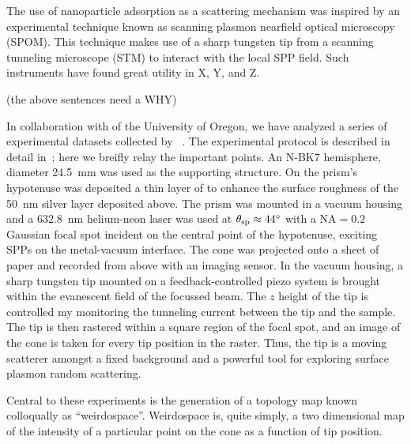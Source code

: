 The use of nanoparticle adsorption as a scattering mechanism was inspired
by an experimental technique known as scanning plasmon nearfield optical
microscopy (SPOM).  This technique makes use of a sharp tungsten tip from a
scanning tunneling microscope (STM) to interact with the local SPP field.
Such instruments have found great utility in X, Y, and Z.

(the above sentences need a WHY)

In collaboration with  of the University of Oregon, we have
analyzed a series of experimental datasets collected by
~\cite{schumann2009surface}.  The experimental protocol is
described in detail in~\cite{schumann2009surface}; here we breifly relay
the important points.  An N-BK7 hemisphere, diameter
\SI{24.5}{\milli\meter} was used as the supporting structure.  On the
prism's hypotenuse was deposited a thin layer of  to enhance the
surface roughness of the \SI{50}{\nano\meter} silver layer deposited above.
The prism was mounted in a vacuum housing and a \SI{632.8}{\nano\meter}
helium-neon laser was used at $\theta_\mathrm{sp}\approx\SI{44}{\degree}$ with a
$\mathrm{NA}=0.2$ Gaussian focal spot incident on the central point of the
hypotenuse, exciting SPPs on the metal-vacuum interface.  The cone was
projected onto a sheet of paper and recorded from above with an imaging
sensor.  In the vacuum housing, a sharp tungsten tip mounted on a
feedback-controlled piezo system is brought within the evanescent field of
the focussed beam.  The $z$ height of the tip is controlled my monitoring
the tunneling current between the tip and the sample.  The tip is then
rastered within a square region of the focal spot, and an image of the cone
is taken for every tip position in the raster.  Thus, the tip is a moving
scatterer amongst a fixed background and a powerful tool for exploring
surface plasmon random scattering.

Central to these experiments is the generation of a topology map known
colloqually as ``weirdospace''.  Weirdospace is, quite simply, a two
dimensional map of the intensity of a particular point on the cone as a
function of tip position.  

